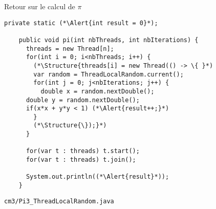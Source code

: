 
\begingroup

\begin{frame}[fragile]{Retour sur le calcul de $\pi$}

  \vfill
  \begin{lstlisting}[gobble=4]
    private static (*\Alert{int result = 0}*);

    public void pi(int nbThreads, int nbIterations) {
      threads = new Thread[n];
      for(int i = 0; i<nbThreads; i++) {
        (*\Structure{threads[i] = new Thread(() -> \{ }*)
        var random = ThreadLocalRandom.current();
        for(int j = 0; j<nbIterations; j++) {
          double x = random.nextDouble();
	  double y = random.nextDouble();
	  if(x*x + y*y < 1) (*\Alert{result++;}*)
        }
        (*\Structure{\});}*)
      }
      
      for(var t : threads) t.start();
      for(var t : threads) t.join();
      
      System.out.println((*\Alert{result}*));
    }
  \end{lstlisting}

  \vfill
  \begin{citing}
    \jitem \lstinline{cm3/Pi3_ThreadLocalRandom.java}
  \end{citing}

\end{frame}

\endgroup
\endinput
